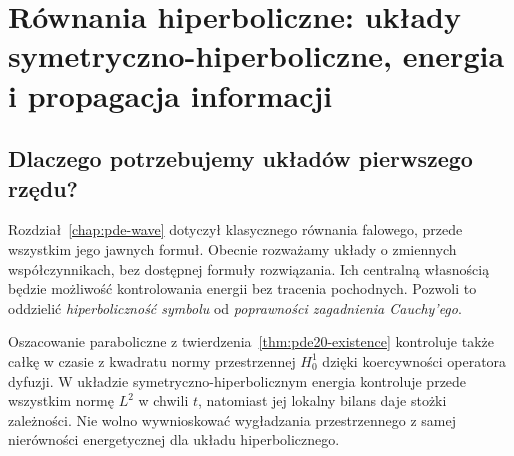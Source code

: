 \chapter[Układy hiperboliczne i propagacja]{Równania hiperboliczne: układy symetryczno-hiperboliczne, energia i propagacja informacji}
\label{chap:pde21}

\section{Dlaczego potrzebujemy układów pierwszego rzędu?}
Rozdział~\ref{chap:pde-wave} dotyczył klasycznego równania falowego, przede wszystkim
jego jawnych formuł. Obecnie rozważamy układy o zmiennych współczynnikach,
bez dostępnej formuły rozwiązania. Ich centralną własnością będzie możliwość
kontrolowania energii bez tracenia pochodnych. Pozwoli to oddzielić
\emph{hiperboliczność symbolu} od \emph{poprawności zagadnienia Cauchy'ego}.

\begin{uwaga}
\label{rem:pde-v43-energy-types}
Oszacowanie paraboliczne z
twierdzenia~\ref{thm:pde20-existence} kontroluje także
całkę w czasie z kwadratu normy przestrzennej $H_0^1$ dzięki
koercywności operatora dyfuzji. W układzie
symetryczno-hiperbolicznym energia kontroluje przede
wszystkim normę $L^2$ w chwili $t$, natomiast jej
lokalny bilans daje stożki zależności. Nie wolno
wywnioskować wygładzania przestrzennego z samej
nierówności energetycznej dla układu hiperbolicznego.
\end{uwaga}

